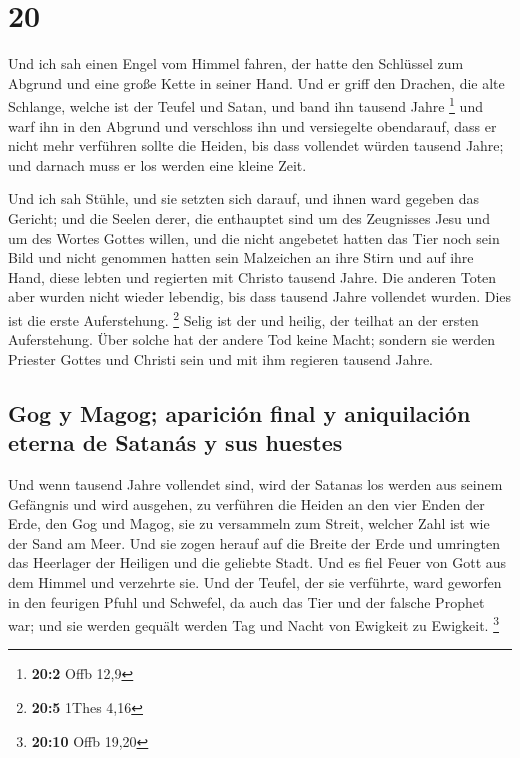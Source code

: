 \hypertarget{section-19}{%
\section{20}\label{section-19}}

 Und ich sah einen Engel vom Himmel fahren, der hatte den
Schlüssel zum Abgrund und eine große Kette in seiner Hand.
 Und er griff den Drachen, die alte Schlange, welche ist
der Teufel und Satan, und band ihn tausend Jahre \footnote{\textbf{20:2}
  Offb 12,9}  und warf ihn in den Abgrund und verschloss
ihn und versiegelte obendarauf, dass er nicht mehr verführen sollte die
Heiden, bis dass vollendet würden tausend Jahre; und darnach muss er los
werden eine kleine Zeit.

 Und ich sah Stühle, und sie setzten sich darauf, und
ihnen ward gegeben das Gericht; und die Seelen derer, die enthauptet
sind um des Zeugnisses Jesu und um des Wortes Gottes willen, und die
nicht angebetet hatten das Tier noch sein Bild und nicht genommen hatten
sein Malzeichen an ihre Stirn und auf ihre Hand, diese lebten und
regierten mit Christo tausend Jahre.  Die anderen Toten
aber wurden nicht wieder lebendig, bis dass tausend Jahre vollendet
wurden. Dies ist die erste Auferstehung. \footnote{\textbf{20:5} 1Thes
  4,16}  Selig ist der und heilig, der teilhat an der
ersten Auferstehung. Über solche hat der andere Tod keine Macht; sondern
sie werden Priester Gottes und Christi sein und mit ihm regieren tausend
Jahre.

\hypertarget{gog-y-magog-apariciuxf3n-final-y-aniquilaciuxf3n-eterna-de-satanuxe1s-y-sus-huestes}{%
\subsection{Gog y Magog; aparición final y aniquilación eterna de
Satanás y sus
huestes}\label{gog-y-magog-apariciuxf3n-final-y-aniquilaciuxf3n-eterna-de-satanuxe1s-y-sus-huestes}}

 Und wenn tausend Jahre vollendet sind, wird der Satanas
los werden aus seinem Gefängnis  und wird ausgehen, zu
verführen die Heiden an den vier Enden der Erde, den Gog und Magog, sie
zu versammeln zum Streit, welcher Zahl ist wie der Sand am Meer.
 Und sie zogen herauf auf die Breite der Erde und
umringten das Heerlager der Heiligen und die geliebte Stadt. Und es fiel
Feuer von Gott aus dem Himmel und verzehrte sie.  Und der
Teufel, der sie verführte, ward geworfen in den feurigen Pfuhl und
Schwefel, da auch das Tier und der falsche Prophet war; und sie werden
gequält werden Tag und Nacht von Ewigkeit zu Ewigkeit. \footnote{\textbf{20:10}
  Offb 19,20}

